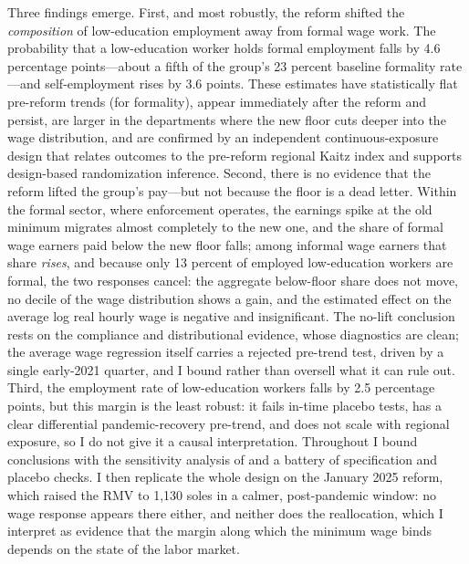 Three findings emerge. First, and most robustly, the reform shifted the \emph{composition}
of low-education employment away from formal wage work. The probability that a low-education
worker holds formal employment falls by 4.6 percentage points---about a fifth of the group's
23 percent baseline formality rate---and self-employment rises by 3.6 points. These estimates
have statistically flat pre-reform trends (for formality), appear immediately after the
reform and persist, are larger in the departments where the new floor cuts deeper into the
wage distribution, and are confirmed by an independent continuous-exposure design that
relates outcomes to the pre-reform regional Kaitz index and supports design-based
randomization inference. Second, there is no evidence that the reform lifted the group's pay---but not because
the floor is a dead letter. Within the formal sector, where enforcement operates, the
earnings spike at the old minimum migrates almost completely to the new one, and the
share of formal wage earners paid below the new floor falls; among informal wage
earners that share \emph{rises}, and because only 13 percent of employed low-education
workers are formal, the two responses cancel: the aggregate below-floor share does not
move, no decile of the wage distribution shows a gain, and the estimated effect on the
average log real hourly wage is negative and insignificant. The no-lift conclusion
rests on the compliance and distributional evidence, whose diagnostics are clean; the
average wage regression itself carries a rejected pre-trend test, driven by a single
early-2021 quarter, and I bound rather than oversell what it can rule out. Third, the employment
rate of low-education workers falls by 2.5 percentage points, but this margin is the least
robust: it fails in-time placebo tests, has a clear differential pandemic-recovery
pre-trend, and does not scale with regional exposure, so I do not give it a causal
interpretation. Throughout I bound conclusions with the sensitivity analysis of
\citet{rambachan_roth_2023} and a battery of specification and placebo checks. I then
replicate the whole design on the January 2025 reform, which raised the RMV to 1,130 soles
in a calmer, post-pandemic window: no wage response appears there either, and neither does
the reallocation, which I interpret as evidence that the margin along which the minimum
wage binds depends on the state of the labor market.

